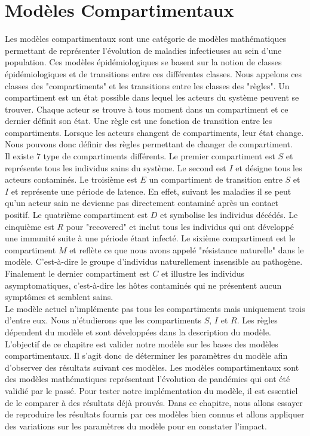 \chapter{Modèles Compartimentaux} \label{ch:intro}

Les modèles compartimentaux sont une catégorie de modèles mathématiques permettant de représenter l'évolution de maladies infectieuses au sein d'une population. Ces modèles épidémiologiques se basent sur la notion de classes épidémiologiques et de transitions entre ces différentes classes. Nous appelons ces classes des "compartiments" et les transitions entre les classes des "règles". Un compartiment est un état possible dans lequel les acteurs du système peuvent se trouver. Chaque acteur se trouve à tous moment dans un compartiment et ce dernier définit son état. Une règle est une fonction de transition entre les compartiments. Lorsque les acteurs changent de compartiments, leur état change. Nous pouvons donc définir des règles permettant de changer de compartiment.\\

Il existe $7$ type de compartiments différents. Le premier compartiment est $S$ et représente tous les individus sains du système. Le second est $I$ et désigne tous les acteurs contaminés. Le troisième est $E$ un compartiment de transition entre $S$ et $I$ et représente une période de latence. En effet, suivant les maladies il se peut qu'un acteur sain ne devienne pas directement contaminé après un contact positif. Le quatrième compartiment est $D$ et symbolise les individus décédés. Le cinquième est $R$ pour "recovered" et inclut tous les individus qui ont développé une immunité suite à une période étant infecté. Le sixième compartiment est le compartiment $M$ et reflète ce que nous avons appelé "résistance naturelle" dans le modèle. C'est-à-dire le groupe d'individus naturellement insensible au pathogène. Finalement le dernier compartiment est $C$ et illustre les individus asymptomatiques, c'est-à-dire les hôtes contaminés qui ne présentent aucun symptômes et semblent sains.\\

Le modèle actuel n'implémente pas tous les compartiments mais uniquement trois d'entre eux. Nous n'étudierons que les compartiments $S$, $I$ et $R$. Les règles dépendent du modèle et sont développées dans la description du modèle.\\

L'objectif de ce chapitre est valider notre modèle sur les bases des modèles compartimentaux. Il s'agit donc de déterminer les paramètres du modèle afin d'observer des résultats suivant ces modèles. Les modèles compartimentaux sont des modèles mathématiques représentant l'évolution de pandémies qui ont été validié par le passé. Pour tester notre implémentation du modèle, il est essentiel de le comparer à des résultats déjà prouvés. Dans ce chapitre, nous allons essayer de reproduire les résultats fournis par ces modèles bien connus et allons appliquer des variations sur les paramètres du modèle pour en constater l'impact.

